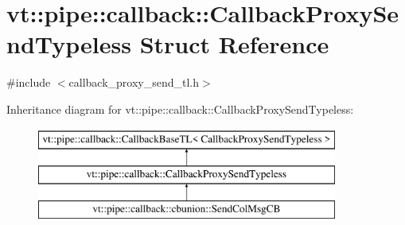 \hypertarget{structvt_1_1pipe_1_1callback_1_1_callback_proxy_send_typeless}{}\section{vt\+:\+:pipe\+:\+:callback\+:\+:Callback\+Proxy\+Send\+Typeless Struct Reference}
\label{structvt_1_1pipe_1_1callback_1_1_callback_proxy_send_typeless}


{\ttfamily \#include $<$callback\+\_\+proxy\+\_\+send\+\_\+tl.\+h$>$}

Inheritance diagram for vt\+:\+:pipe\+:\+:callback\+:\+:Callback\+Proxy\+Send\+Typeless\+:\begin{figure}[H]
\begin{center}
\leavevmode
\includegraphics[height=3.000000cm]{structvt_1_1pipe_1_1callback_1_1_callback_proxy_send_typeless}
\end{center}
\end{figure}
